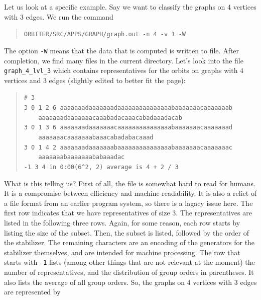\bigskip


Let us look at a specific example. Say we want to classify the 
graphs on $4$ vertices with $3$ edges. 
We run the command
\begin{quote}
\verb'ORBITER/SRC/APPS/GRAPH/graph.out -n 4 -v 1 -W'\\
\end{quote}
The option \verb'-W' means that the data that is computed is 
written to file. After completion, we find many files in 
the current directory. Let's look into the file 
\verb'graph_4_lvl_3' which contains representatives for the 
orbits on graphs with $4$ vertices and $3$ edges (slightly edited to better fit the page):
\begin{quote}
\verb'# 3'\\
\verb'3 0 1 2 6 aaaaaaadaaaaaaadaaaaaaaaaaaaaaabaaaaaaacaaaaaaab'\\
\verb'    aaaaaaadaaaaaaacaaabadacaaacabadaaadacab'\\
\verb'3 0 1 3 6 aaaaaaadaaaaaaacaaaaaaaaaaaaaaabaaaaaaacaaaaaaad'\\
\verb'    aaaaaaacaaaaaaabaaacabadabacaaad'\\
\verb'3 0 1 4 2 aaaaaaadaaaaaaabaaaaaaaaaaaaaaabaaaaaaacaaaaaaac'\\
\verb'    aaaaaaabaaaaaaababaaadac'\\
\verb'-1 3 4 in 0:00(6^2, 2) average is 4 + 2 / 3'\\
\end{quote}
What is this telling us? First of all, the file is somewhat hard to read for humans. 
It is a compromise between efficiency and machine readability. It is also 
a relict of a file format from an earlier program system, so there is a lagacy issue here.
The first row indicates that we have representatives of size $3$. 
The representatives are listed in the following three rows. 
Again, for some reason, each row starts by listing the size of the subset. 
Then, the subset is listed, followed by the order of the stabilizer. 
The remaining characters are an encoding of the generators for the stabilizer themselves, 
and are intended for machine processing. 
The row that starts with \verb'-1' lists (among other things that are not relevant at the moment) 
the number of representatives, and the distribution of group orders in parentheses. It also lists the average of all group orders.
So, the graphs on 4 vertices with $3$ edges are represented by 
